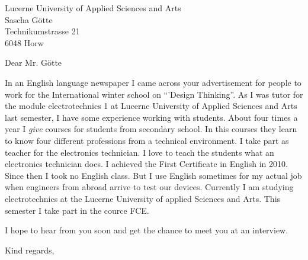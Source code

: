 \documentclass{letter}
\begin{document}
\begin{letter}{Lucerne University of Applied Sciences and Arts\\
Sascha Götte\\
Technikumstrasse 21\\
6048 Horw}
\opening{Dear Mr. Götte}
In an English language newspaper I came across your advertisement for people 
to work for the International winter school on "`'Design Thinking"'. As I was 
tutor for the module electrotechnics 1 at Lucerne University of Applied 
Sciences and Arts last semester, I have some experience working with students. 
About four times a year I \emph{give} courses for students from secondary 
school. In this courses they learn to know four different professions from a 
technical environment. I take part as teacher for the electronics technician. 
I love to teach the students what an electronics technician does. I achieved 
the First Certificate in English in 2010. Since then I took no English class. 
But I use English sometimes for my actual job when engineers from abroad 
arrive to test our devices. Currently I am studying electrotechnics at the 
Lucerne University of applied Sciences and Arts. This semester I take part 
in the cource FCE. 

I hope to hear from you soon and get the chance to meet you at an interview. 
%
\closing{Kind regards, }
%
\end{letter}
\end{document}
